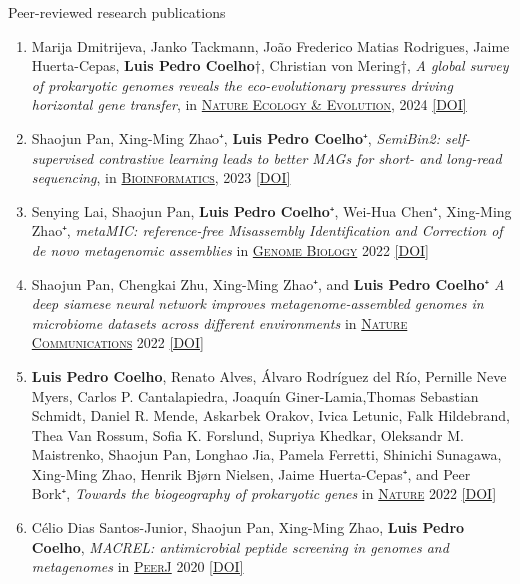 \documentclass{article}
\renewcommand\subsubsection[1]{%
    \par\vspace{.1em}%
    {\hspace{1em}\subsubsubhead #1}%
    \par\vspace{.2em}%
}
\newcommand\showdoi[1]{%
    \href{http://dx.doi.org/#1}{[DOI]}%
}
\newcommand\pubname[1]{\textsc{\uline{#1}}}
\newcommand\cosenior{†}
\begin{document}
\subsubsection{Peer-reviewed research publications}

\begin{enumerate}[resume]

\item Marija Dmitrijeva, Janko Tackmann, João Frederico Matias Rodrigues, Jaime Huerta-Cepas, \textbf{Luis Pedro Coelho}\cosenior, Christian von Mering\cosenior, \emph{A global survey of prokaryotic genomes reveals the eco-evolutionary pressures driving horizontal gene transfer}, in \pubname{Nature Ecology \& Evolution}, 2024 \showdoi{10.1038/s41559-024-02357-0}

\item Shaojun Pan, Xing-Ming Zhao⁺, \textbf{Luis Pedro Coelho}⁺, \emph{SemiBin2: self-supervised contrastive learning leads to better MAGs for short- and long-read sequencing}, in \pubname{Bioinformatics}, 2023 \showdoi{10.1093/bioinformatics/btad209}

\item Senying Lai, Shaojun Pan, \textbf{Luis Pedro Coelho}⁺, Wei-Hua Chen⁺,
Xing-Ming Zhao⁺, \emph{metaMIC: reference-free Misassembly Identification and
Correction of de novo metagenomic assemblies} in \pubname{Genome Biology} 2022
\showdoi{10.1186/s13059-022-02810-y}


\item Shaojun Pan, Chengkai Zhu, Xing-Ming Zhao⁺, and \textbf{Luis Pedro
Coelho}⁺ \emph{A deep siamese neural network improves metagenome-assembled
genomes in microbiome datasets across different environments} in
\pubname{Nature Communications} 2022 \showdoi{10.1038/s41467-022-29843-y}

\item \textbf{Luis Pedro Coelho}, Renato Alves, Álvaro Rodríguez del Río,
Pernille Neve Myers, Carlos P. Cantalapiedra, Joaquín Giner-Lamia,Thomas
Sebastian Schmidt, Daniel R. Mende, Askarbek Orakov, Ivica Letunic, Falk
Hildebrand, Thea Van Rossum, Sofia K. Forslund, Supriya Khedkar, Oleksandr M.
Maistrenko, Shaojun Pan, Longhao Jia, Pamela Ferretti, Shinichi Sunagawa,
Xing-Ming Zhao, Henrik Bjørn Nielsen, Jaime Huerta-Cepas⁺, and Peer Bork⁺,
\emph{Towards the biogeography of prokaryotic genes} in \pubname{Nature} 2022
\showdoi{10.1038/s41586-021-04233-4}

\item Célio Dias Santos-Junior, Shaojun Pan, Xing-Ming Zhao, \textbf{Luis Pedro
Coelho}, \emph{MACREL: antimicrobial peptide screening in genomes and
metagenomes} in \pubname{PeerJ} 2020 \showdoi{10.7717/peerj.10555}


\end{enumerate}
\end{document}
